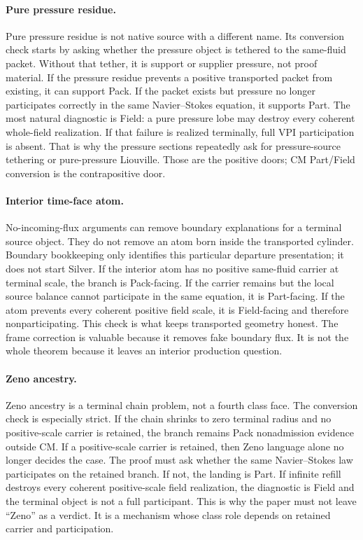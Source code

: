 \paragraph{Pure pressure residue.}
Pure pressure residue is not native source with a different name.
Its conversion check starts by asking whether the pressure object is tethered
to the same-fluid packet.
Without that tether, it is support or supplier pressure, not proof material.
If the pressure residue prevents a positive transported packet from existing,
it can support Pack.
If the packet exists but pressure no longer participates correctly in the same
Navier--Stokes equation, it supports Part.
The most natural diagnostic is Field: a pure pressure lobe may destroy every
coherent whole-field realization.  If that failure is realized terminally,
full VPI participation is absent.
That is why the pressure sections repeatedly ask for pressure-source tethering
or pure-pressure Liouville.
Those are the positive doors; CM Part/Field conversion is the contrapositive door.

\paragraph{Interior time-face atom.}
No-incoming-flux arguments can remove boundary explanations for a terminal
source object.
They do not remove an atom born inside the transported cylinder.
Boundary bookkeeping only identifies this particular departure presentation;
it does not start Silver.
If the interior atom has no positive same-fluid carrier at terminal scale, the
branch is Pack-facing.
If the carrier remains but the local source balance cannot participate in the
same equation, it is Part-facing.
If the atom prevents every coherent positive field scale, it is Field-facing
and therefore nonparticipating.
This check is what keeps transported geometry honest.
The frame correction is valuable because it removes fake boundary flux.
It is not the whole theorem because it leaves an interior production question.

\paragraph{Zeno ancestry.}
Zeno ancestry is a terminal chain problem, not a fourth class face.
The conversion check is especially strict.
If the chain shrinks to zero terminal radius and no positive-scale carrier is
retained, the branch remains Pack nonadmission evidence outside CM.
If a positive-scale carrier is retained, then Zeno language alone no longer
decides the case.
The proof must ask whether the same Navier--Stokes law participates on the
retained branch.
If not, the landing is Part.
If infinite refill destroys every coherent positive-scale field realization,
the diagnostic is Field and the terminal object is not a full participant.
This is why the paper must not leave ``Zeno'' as a verdict.
It is a mechanism whose class role depends on retained carrier and
participation.

